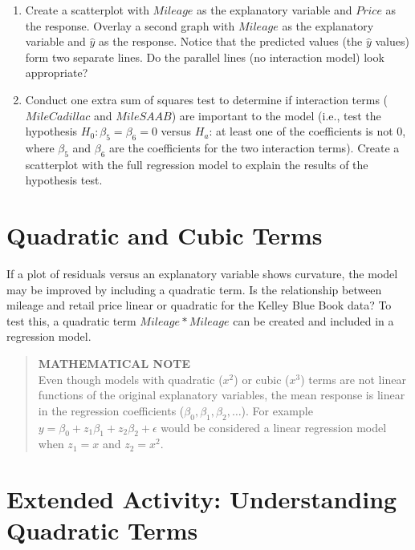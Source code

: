 \documentclass[
]{report}
\providecommand{\tightlist}{%
  \setlength{\itemsep}{0pt}\setlength{\parskip}{0pt}}
\begin{document}
\begin{enumerate}
\def\labelenumi{\alph{enumi}.}
\tightlist
\item
  Create a scatterplot with \(Mileage\) as the explanatory variable and \(Price\) as the response. Overlay a second graph with \(Mileage\) as the explanatory variable and \(\hat y\) as the response. Notice that the predicted values (the \(\hat y\) values) form two separate lines. Do the parallel lines (no interaction model) look appropriate?
\item
  Conduct one extra sum of squares test to determine if interaction terms (\(MileCadillac\) and \(MileSAAB\)) are important to the model (i.e., test the hypothesis \(H_0: \beta_5 = \beta_6 = 0\) versus \(H_a\): at least one of the coefficients is not 0, where \(\beta_5\) and \(\beta_6\) are the coefficients for the two interaction terms). Create a scatterplot with the full regression model to explain the results of the hypothesis test.
\end{enumerate}

\hypertarget{quadratic-and-cubic-terms}{%
\section*{Quadratic and Cubic Terms}\label{quadratic-and-cubic-terms}}

If a plot of residuals versus an explanatory variable shows curvature, the model may be improved by including a quadratic term. Is the relationship between mileage and retail price linear or quadratic for the Kelley Blue Book data? To test this, a quadratic term \(Mileage*Mileage\) can be created and included in a regression model.

\begin{quote}
\textbf{MATHEMATICAL NOTE}\\
Even though models with quadratic (\(x^2\)) or cubic (\(x^3\)) terms are not linear functions of the original explanatory variables, the mean response is linear in the regression coefficients (\(\beta_0, \beta_1, \beta_2, \dots\)). For example \(y = \beta_0 + z_1 \beta_1 + z_2 \beta_2 + \epsilon\) would be considered a linear regression model when \(z_1 = x\) and \(z_2 = x^2\).
\end{quote}

\hypertarget{extended-activity-understanding-quadratic-terms}{%
\section*{Extended Activity: Understanding Quadratic Terms}\label{extended-activity-understanding-quadratic-terms}}
\end{document}

